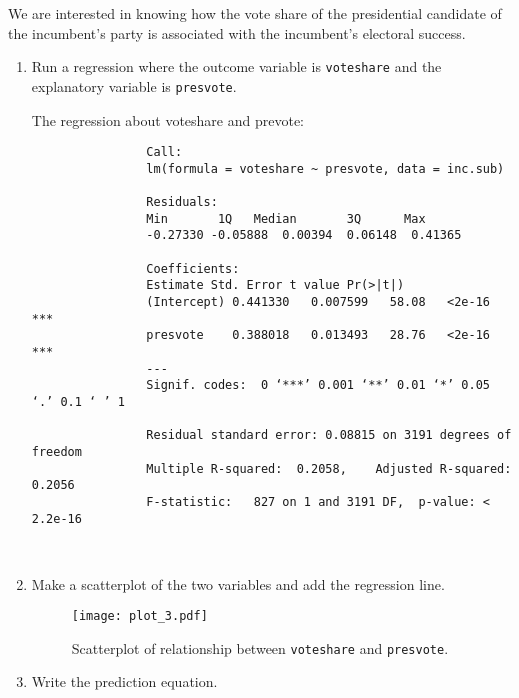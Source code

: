 \documentclass[12pt,letterpaper]{article}
\begin{document}
\noindent We are interested in knowing how the vote share of the presidential candidate of the incumbent's party is associated with the incumbent's electoral success.
	\vspace{.25cm}
	\begin{enumerate}
		\item Run a regression where the outcome variable is \texttt{voteshare} and the explanatory variable is \texttt{presvote}.
			
			\vspace{.15cm}
			 
			\vspace{.15cm}
			\noindent The regression about voteshare and prevote:\\
		\begin{footnotesize}
			\begin{verbatim}
				Call:
				lm(formula = voteshare ~ presvote, data = inc.sub)
				
				Residuals:
				Min       1Q   Median       3Q      Max 
				-0.27330 -0.05888  0.00394  0.06148  0.41365 
				
				Coefficients:
				Estimate Std. Error t value Pr(>|t|)    
				(Intercept) 0.441330   0.007599   58.08   <2e-16 ***
				presvote    0.388018   0.013493   28.76   <2e-16 ***
				---
				Signif. codes:  0 ‘***’ 0.001 ‘**’ 0.01 ‘*’ 0.05 ‘.’ 0.1 ‘ ’ 1
				
				Residual standard error: 0.08815 on 3191 degrees of freedom
				Multiple R-squared:  0.2058,	Adjusted R-squared:  0.2056 
				F-statistic:   827 on 1 and 3191 DF,  p-value: < 2.2e-16
				
				
			\end{verbatim}
		\end{footnotesize}
		\item Make a scatterplot of the two variables and add the regression line. 
		
		\vspace{.15cm}
		 
		\vspace{.15cm}
		\begin{figure}[h!]\centering
			
			\caption{\footnotesize Scatterplot of relationship between \texttt{voteshare} and \texttt{presvote}.}
			\label{fig:plot_3}
			\texttt{[image: plot\_3.pdf]}
		\end{figure}
		
		\item Write the prediction equation.\\
		

\end{enumerate}
\end{document}
